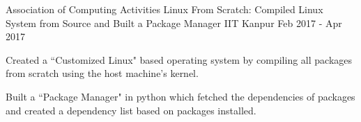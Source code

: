 \begin{cventries}





  \cventry
    {Association of Computing Activities} %
    {Linux From Scratch: Compiled Linux System from Source and Built a Package Manager} %
    {IIT Kanpur} %
    {Feb 2017 - Apr 2017} %
    {
      \begin{cvitems} %
        \item {Created a ``Customized Linux" based operating system by compiling all packages from scratch using the host machine's kernel.}
        \item {Built a ``Package Manager" in python which fetched the dependencies of packages and created a dependency list based on packages installed.} 
      \end{cvitems}
    }

\end{cventries}
